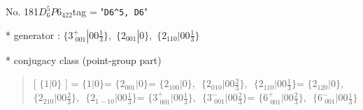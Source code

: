 \documentclass[fleqn,10pt,landscape]{jsarticle}
\begin{document}
\newpage

No. 181\quad$D_{6}^{5}$\quad$P6_422$\quad[ hexagonal ]
tag = "{\tt D6^5, D6}"

* generator : $\{3^{+}_{\,\,001}|0 0 \frac{1}{3}\},\,\,\{2{}_{001}|0\},\,\,\{2{}_{110}|0 0 \frac{1}{3}\}$

* conjugacy class (point-group part)
\begin{quote}
[ $\{1|0\}$ ] = \quad $\{1|0\}$\newline[ $\{2{}_{001}|0\}$ ] = \quad $\{2{}_{001}|0\}$\newline[ $\{2{}_{100}|0\}$ ] = \quad $\{2{}_{100}|0\}$,\,\, $\{2{}_{010}|0 0 \frac{2}{3}\}$,\,\, $\{2{}_{110}|0 0 \frac{1}{3}\}$\newline[ $\{2{}_{120}|0\}$ ] = \quad $\{2{}_{120}|0\}$,\,\, $\{2{}_{210}|0 0 \frac{2}{3}\}$,\,\, $\{2{}_{1-10}|0 0 \frac{1}{3}\}$\newline[ $\{3^{+}_{\,\,001}|0 0 \frac{1}{3}\}$ ] = \quad $\{3^{+}_{\,\,001}|0 0 \frac{1}{3}\}$,\,\, $\{3^{-}_{\,\,001}|0 0 \frac{2}{3}\}$\newline[ $\{6^{+}_{\,\,001}|0 0 \frac{2}{3}\}$ ] = \quad $\{6^{+}_{\,\,001}|0 0 \frac{2}{3}\}$,\,\, $\{6^{-}_{\,\,001}|0 0 \frac{1}{3}\}$\newline
\end{quote}
\end{document}
